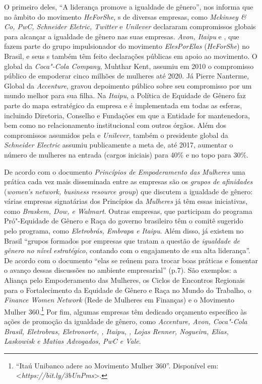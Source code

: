 O primeiro deles, ``A liderança promove a igualdade de gênero'', nos
informa que no âmbito do movimento \emph{HeForShe}, s de diversas
empresas, como \emph{Mckinsey \& Co, PwC, Schneider Eletric, Twitter} e
\emph{Unilever} declararam compromissos globais para alcançar a
igualdade de gênero nas suas empresas. \emph{Avon, Itaipu} e
\emph{}, que fazem parte do grupo impulsionador do movimento
\emph{ElesPorElas} (\emph{HeForShe}) no Brasil, e seus s também têm
feito declarações públicas em apoio ao movimento. O  global da
\emph{Coca"-Cola Company}, Muhthar Kent, assumiu em 2010 o compromisso
público de empoderar cinco milhões de mulheres até 2020. Já Pierre
Nanterme,  Global da \emph{Accenture}, gravou depoimento público
sobre seu compromisso por um mundo melhor para sua filha. Na
\emph{Itaipu}, a Política de Equidade de Gênero faz parte do mapa
estratégico da empresa e é implementada em todas as esferas, incluindo
Diretoria, Conselho e Fundações em que a Entidade for mantenedora, bem
como no relacionamento institucional com outros órgãos. Além dos
compromissos assumidos pela \emph{} e \emph{Unilever}, também o
presidente global da \emph{Schneider Electric} assumiu publicamente a
meta de, até 2017, aumentar o número de mulheres na entrada (cargos
iniciais) para 40\% e no topo para 30\%.

De acordo com o documento \emph{Princípios de Empoderamento das
Mulheres} uma prática cada vez mais disseminada entre as empresas são os
\emph{grupos de afinidades} (\emph{women's network, business resource
group}) que discutem a igualdade de gênero: várias empresas signatárias
dos Princípios da \emph{ Mulheres} já têm essas iniciativas, como
\emph{Braskem, Dow,  e Walmart}. Outras empresas, que participam do
programa Pró"-Equidade de Gênero e Raça do governo brasileiro têm o
comitê sugerido pelo programa, como \emph{Eletrobrás, Embrapa e Itaipu}.
Além disso, já existem no Brasil ``grupos formados por empresas que
tratam a questão de \emph{igualdade de gênero no nível estratégico},
contando com o engajamento de sua alta liderança''. De acordo com o
documento ``elas se reúnem para trocar boas práticas e fomentar o avanço
dessas discussões no ambiente empresarial'' (p.7). São exemplos: a
Aliança pelo Empoderamento das Mulheres, os Ciclos de Encontros
Regionais para o Fortalecimento da Equidade de Gênero e Raça no Mundo do
Trabalho, o \emph{Finance Women Network} (Rede de Mulheres em Finanças)
e o Movimento Mulher 360.\footnote{``Itaú Unibanco adere ao Movimento
  Mulher 360''. Disponível em:
  \textless{}\emph{https://bit.ly/3bUnPms}\textgreater{}.}
Por fim, algumas empresas têm dedicado orçamento específico às ações de
promoção da igualdade de gênero, como \emph{Accenture, Avon, Coca"-Cola
Brasil, Eletrobras, Eletronorte, , Itaipu, , Lojas Renner,
Nogueira, Elias, Laskowisk e Matias Advogados, PwC e Vale}.

